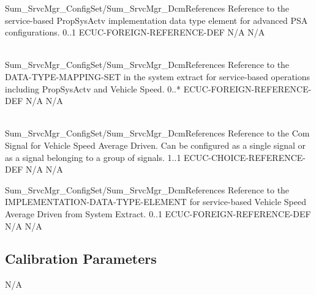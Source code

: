 {Sum_SrvcMgr_ConfigSet/Sum_SrvcMgr_DcmReferences}
{Reference to the service-based PropSysActv implementation data type element for advanced PSA configurations.}
{0..1}
{ECUC-FOREIGN-REFERENCE-DEF}
{N/A}
{N/A}
{}
{ }

\\
{Sum_SrvcMgr_ConfigSet/Sum_SrvcMgr_DcmReferences}
{Reference to the DATA-TYPE-MAPPING-SET in the system extract for service-based operations including PropSysActv and Vehicle Speed.}
{0..*}
{ECUC-FOREIGN-REFERENCE-DEF}
{N/A}
{N/A}
{}
{   }


\\
{Sum_SrvcMgr_ConfigSet/Sum_SrvcMgr_DcmReferences}
{Reference to the Com Signal for Vehicle Speed Average Driven. Can be configured as a single signal or as a signal belonging to a group of signals.}
{1..1}
{ECUC-CHOICE-REFERENCE-DEF}
{N/A}
{N/A}

{Sum_SrvcMgr_ConfigSet/Sum_SrvcMgr_DcmReferences}
{Reference to the IMPLEMENTATION-DATA-TYPE-ELEMENT for service-based Vehicle Speed Average Driven from System Extract.}
{0..1}
{ECUC-FOREIGN-REFERENCE-DEF}
{N/A}
{N/A}
{}
{ }

\subsection{Calibration Parameters}
N/A
